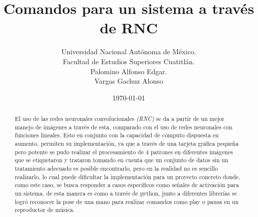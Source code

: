 \documentclass[a4paper, 12pt]{article}
\title{Comandos para un sistema a través de RNC}
\author{Universidad Nacional Autónoma de México.\\Facultad de Estudios Superiores Cuatitlán.\\Palomino Alfonso Edgar.\\Vargas Gachuz Alonso}
\date{\today}
\begin{document}
    \maketitle 
    \begin{abstract}      
        El uso de las redes neuronales convolucionales \emph{(RNC)} se da a partir de un mejor manejo de imágenes a través de esta, comparado con el uso de redes neuronales con funciones lineales. Esto en conjunto con la capacidad de cómputo dispuesta en aumento, permiten su implementación, ya que a través de una tarjeta gráfica pequeña pero potente se pudo realizar el procesamiento de 4 patrones en diferentes imágenes que se etiquetaron y trataron tomando en cuenta que un conjunto de datos sin un tratamiento adecuado es posible encontrarlo, pero en la realidad no es sencillo realizarlo, lo cual puede dificultar la implementación para un proyecto concreto donde, como este caso, se busca responder a casos específicos como señales de activación para un sistema. de esta manera es como a través de python, junto a diferentes librerías se logró reconocer la pose de una mano para realizar comandos como play o pausa en un reproductor de música.
    \end{abstract} 
    \vspace{2ex}
\end{document}

